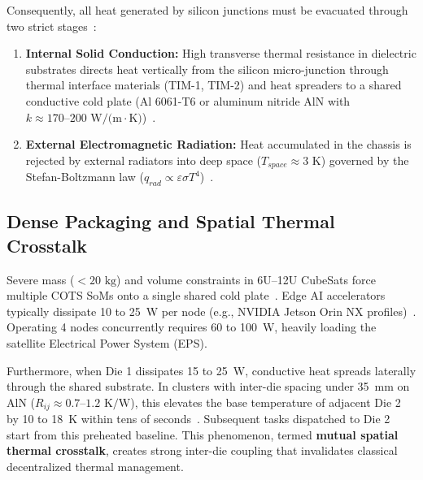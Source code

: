 \documentclass[journal]{IEEEtran}
\begin{document}
Consequently, all heat generated by silicon junctions must be evacuated through two strict stages~\cite{ecss2008thermal, gilmore2002handbook}:
\begin{enumerate}
    \item \textbf{Internal Solid Conduction:} High transverse thermal resistance in dielectric substrates directs heat vertically from the silicon micro-junction through thermal interface materials (TIM-1, TIM-2) and heat spreaders to a shared conductive cold plate (Al 6061-T6 or aluminum nitride AlN with $k \approx 170\text{--}200\text{ W/(m}\cdot\text{K)}$)~\cite{nasa2022handbook, ecss2008thermal}.
    \item \textbf{External Electromagnetic Radiation:} Heat accumulated in the chassis is rejected by external radiators into deep space ($T_{space} \approx 3\text{ K}$) governed by the Stefan-Boltzmann law ($q_{rad} \propto \varepsilon \sigma T^4$)~\cite{incropera2011fundamentals, pederson2024radiator}.
\end{enumerate}

\subsection{Dense Packaging and Spatial Thermal Crosstalk}
Severe mass ($< 20\text{ kg}$) and volume constraints in 6U--12U CubeSats force multiple COTS SoMs onto a single shared cold plate~\cite{nasa2022handbook}. Edge AI accelerators typically dissipate 10 to 25~W per node (e.g., NVIDIA Jetson Orin NX profiles)~\cite{ortiz2024spirit}. Operating 4 nodes concurrently requires 60 to 100~W, heavily loading the satellite Electrical Power System (EPS).

Furthermore, when Die 1 dissipates 15 to 25~W, conductive heat spreads laterally through the shared substrate. In clusters with inter-die spacing under 35~mm on AlN ($R_{ij} \approx 0.7\text{--}1.2\text{ K/W}$), this elevates the base temperature of adjacent Die 2 by 10 to 18~K within tens of seconds~\cite{chen2026hotai, wang2025packaging}. Subsequent tasks dispatched to Die 2 start from this preheated baseline. This phenomenon, termed \textbf{mutual spatial thermal crosstalk}, creates strong inter-die coupling that invalidates classical decentralized thermal management.
\end{document}
